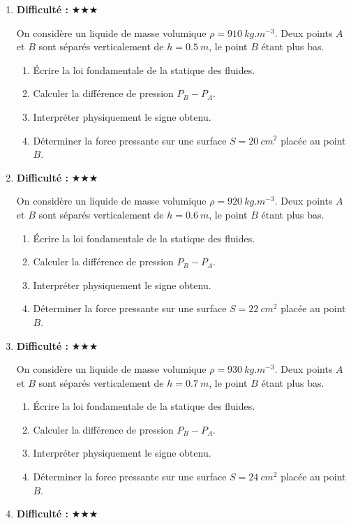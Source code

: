 \documentclass[11pt,a4paper]{article}
\newcommand{\etoiles}[1]{\textbf{Difficulté : }#1}
\begin{document}
\begin{enumerate}[label=\textbf{Exercice \arabic*.},leftmargin=*]
Une charge ponctuelle $Q=1\times10^{-8}\ \si{C}$ crée un champ électrostatique. On étudie un point situé à $r=0.28\ \si{m}$.
\begin{enumerate}[label=\alph*)]
\item Donner l'expression de la valeur du champ électrostatique.
\item Calculer cette valeur.
\item Préciser la direction et le sens du champ pour $Q>0$ puis pour $Q<0$.
\item Une charge test négative est placée en ce point : indiquer le sens de la force subie.
\end{enumerate}
\item \etoiles{★★★}

On considère un liquide de masse volumique $\rho=910\ \si{kg.m^{-3}}$.
Deux points $A$ et $B$ sont séparés verticalement de $h=0.5\ \si{m}$, le point $B$ étant plus bas.
\begin{enumerate}[label=\alph*)]
\item Écrire la loi fondamentale de la statique des fluides.
\item Calculer la différence de pression $P_B-P_A$.
\item Interpréter physiquement le signe obtenu.
\item Déterminer la force pressante sur une surface $S=20\ \si{cm^2}$ placée au point $B$.
\end{enumerate}
\item \etoiles{★★★}

On considère un liquide de masse volumique $\rho=920\ \si{kg.m^{-3}}$.
Deux points $A$ et $B$ sont séparés verticalement de $h=0.6\ \si{m}$, le point $B$ étant plus bas.
\begin{enumerate}[label=\alph*)]
\item Écrire la loi fondamentale de la statique des fluides.
\item Calculer la différence de pression $P_B-P_A$.
\item Interpréter physiquement le signe obtenu.
\item Déterminer la force pressante sur une surface $S=22\ \si{cm^2}$ placée au point $B$.
\end{enumerate}
\item \etoiles{★★★}

On considère un liquide de masse volumique $\rho=930\ \si{kg.m^{-3}}$.
Deux points $A$ et $B$ sont séparés verticalement de $h=0.7\ \si{m}$, le point $B$ étant plus bas.
\begin{enumerate}[label=\alph*)]
\item Écrire la loi fondamentale de la statique des fluides.
\item Calculer la différence de pression $P_B-P_A$.
\item Interpréter physiquement le signe obtenu.
\item Déterminer la force pressante sur une surface $S=24\ \si{cm^2}$ placée au point $B$.
\end{enumerate}
\item \etoiles{★★★}


\end{enumerate}
\end{document}
